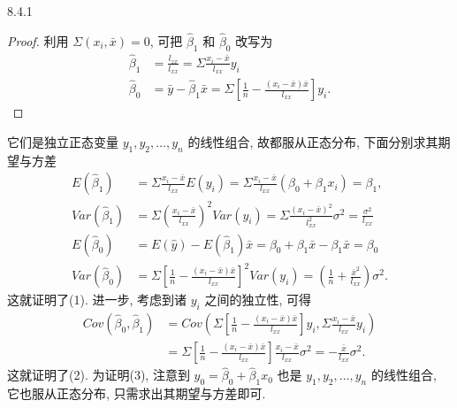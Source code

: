 \begin{theorem}{}{8.4.1}
\begin{proof}
利用 $\Sigma(x_i, \bar{x}) = 0$, 可把 $\hat{\beta}_{1}$ 和 $\hat{\beta}_{0}$ 改写为
  \begin{equation*}
    \begin{split}
      \hat{\beta}_{1} & = \frac{l_{zx}}{l_{xx}} = \Sigma \frac{x_{i} - \bar{x}}{l_{xx}} y_{i} \\ 
      \hat{\beta}_{0} & = \bar{y} - \hat{\beta}_{1} \bar{x} = \Sigma\left[\frac{1}{n} - \frac{(x_{i} - \bar{x}) \bar{x}}{l_{xx}}\right] y_{i}.
    \end{split}
  \end{equation*}
\end{proof}  
它们是独立正态变量 $y_1,y_2, \ldots, y_n$ 的线性组合, 故都服从正态分布, 下面分别求其期望与方差
\begin{equation*}
\begin{split} 
E(\hat{\beta}_{1}) & = \Sigma \frac{x_{i} - \bar{x}}{l_{xx}} E(y_{i}) = \Sigma \frac{x_{i} - \bar{x}}{l_{xx}}(\beta_{0} + \beta_{1} x_{i}) = \beta_{1}, \\ 
Var(\hat{\beta}_{1}) & = \Sigma\left(\frac{x_{i} - \bar{x}}{l_{xx}} \right)^{2}  Var(y_{i}) = \Sigma \frac{(x_{i}-\bar{x})^{2}}{l_{xx}^{2}} \sigma^{2} = \frac{\sigma^{2}}{l_{xx}} \\ 
E(\hat{\beta}_{0}) & = E(\hat{y}) - E(\hat{\beta}_{1}) \bar{x} = \beta_{0} + \beta_{1} \bar{x} - \beta_{1} \bar{x} = \beta_{0} \\ 
Var(\hat{\beta}_{0}) & = \Sigma\left[\frac{1}{n} - \frac{(x_{i} - \bar{x}) \bar{x}}{l_{xx}}\right]^{2} Var(y_{i}) = \left(\frac{1}{n} + \frac{\bar{x}^{2}}{l_{xx}}\right)\sigma^{2}.
\end{split}
\end{equation*}
这就证明了(1). 进一步, 考虑到诸 $y_i$ 之间的独立性, 可得
\begin{equation*}
\begin{aligned} 
Cov(\hat{\beta}_{0}, \hat{\beta}_{1}) & = Cov\left(\Sigma \left[\frac{1}{n}-\frac{(x_{i}-\bar{x})\bar{x}}{l_{x x}} \right] y_{i}, \Sigma \frac{x_{i} -\bar{x}}{l_{xx}} y_{i}\right) \\ 
 & = \Sigma\left[\frac{1}{n}-\frac{(x_{i}-\bar{x}) \bar{x}}{l_{xx}}\right] \frac{x_{i}-\bar{x}}{l_{xx}} \sigma^{2} = - \frac{\bar{x}}{l_{xx}} \sigma^{2}.
\end{aligned}
\end{equation*}
这就证明了(2). 为证明(3), 注意到 $\hat{y}_0 = \hat{\beta}_0 + \hat{\beta}_1 x_0$ 也是 $y_1, y_2, \ldots, y_n$ 的线性组合, 它也服从正态分布, 只需求出其期望与方差即可.

\end{theorem}
